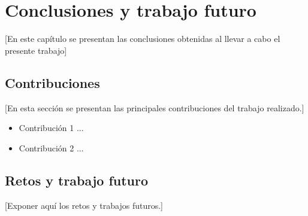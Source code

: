 \chapter{Conclusiones y trabajo futuro}\label{cap:evaluacion}

[En este capítulo se presentan las conclusiones obtenidas al llevar a cabo el presente trabajo]

\section{Contribuciones}

[En esta sección se presentan las principales contribuciones del trabajo realizado.]

\begin{itemize}
    
    \item Contribución 1 ...
    
    \item Contribución 2 ...
    
\end{itemize}

\section{Retos y trabajo futuro}

[Exponer aquí los retos y trabajos futuros.]